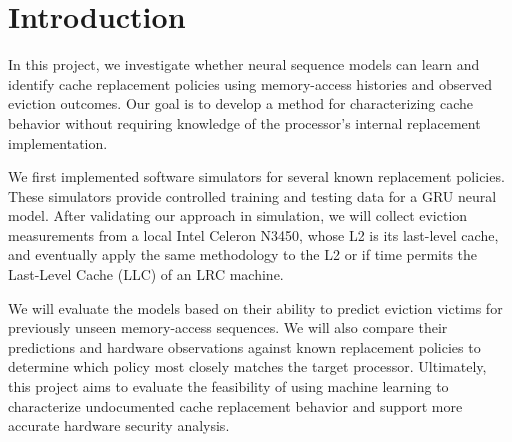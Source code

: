 \section{Introduction}
\label{sec:introduction}

In this project, we investigate whether neural sequence models can learn and identify cache replacement policies using memory-access histories and observed eviction outcomes. Our goal is to develop a method for characterizing cache behavior without requiring knowledge of the processor's internal replacement implementation.

We first implemented software simulators for several known replacement policies. These simulators provide controlled training and testing data for a GRU neural model. After validating our approach in simulation, we will collect eviction measurements from a local Intel Celeron N3450, whose L2 is its last-level cache, and eventually apply the same methodology to the L2 or if time permits the Last-Level Cache (LLC) of an LRC machine.

We will evaluate the models based on their ability to predict eviction victims for previously unseen memory-access sequences. We will also compare their predictions and hardware observations against known replacement policies to determine which policy most closely matches the target processor. Ultimately, this project aims to evaluate the feasibility of using machine learning to characterize undocumented cache replacement behavior and support more accurate hardware security analysis.
